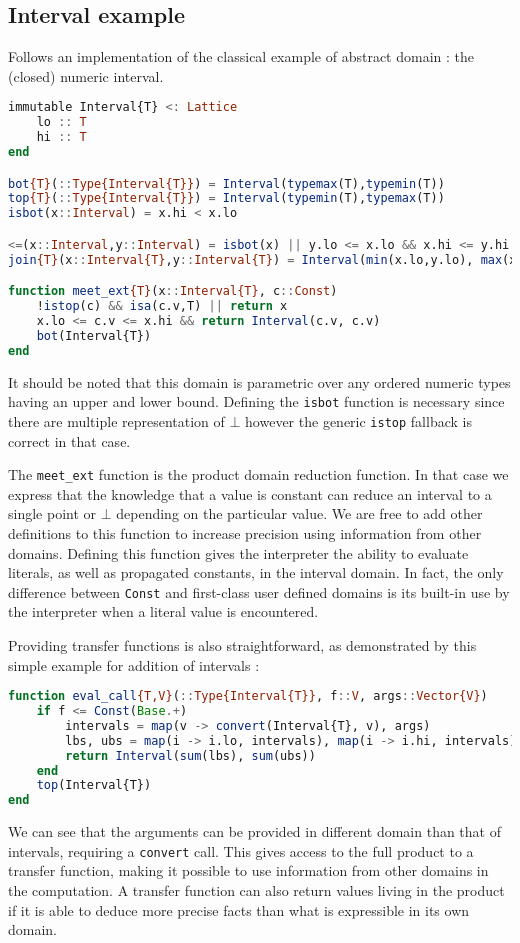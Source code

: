 \documentclass[11pt]{article}
\begin{document}
\subsection*{Interval example}
Follows an implementation of the classical example of abstract domain : the (closed) numeric interval.
\begin{singlespace}
\begin{lstlisting}[language=julia]
immutable Interval{T} <: Lattice
    lo :: T
    hi :: T
end

bot{T}(::Type{Interval{T}}) = Interval(typemax(T),typemin(T))
top{T}(::Type{Interval{T}}) = Interval(typemin(T),typemax(T))
isbot(x::Interval) = x.hi < x.lo

<=(x::Interval,y::Interval) = isbot(x) || y.lo <= x.lo && x.hi <= y.hi
join{T}(x::Interval{T},y::Interval{T}) = Interval(min(x.lo,y.lo), max(x.hi,y.hi))

function meet_ext{T}(x::Interval{T}, c::Const)
    !istop(c) && isa(c.v,T) || return x
    x.lo <= c.v <= x.hi && return Interval(c.v, c.v)
    bot(Interval{T})
end
\end{lstlisting}
\end{singlespace}
It should be noted that this domain is parametric over any ordered numeric types having an upper and lower bound. Defining the \verb~isbot~ function is necessary since there are multiple representation of $\bot$ however the generic \verb~istop~ fallback is correct in that case.

The \verb~meet_ext~ function is the product domain reduction function. In that case we express that the knowledge that a value is constant can reduce an interval to a single point or $\bot$ depending on the particular value. We are free to add other definitions to this function to increase precision using information from other domains.
Defining this function gives the interpreter the ability to evaluate literals, as well as propagated constants, in the interval domain. In fact, the only difference between \verb~Const~ and first-class user defined domains is its built-in use by the interpreter when a literal value is encountered.

Providing transfer functions is also straightforward, as demonstrated by this simple example for addition of intervals :
\begin{singlespace}
\begin{lstlisting}[language=julia]
function eval_call{T,V}(::Type{Interval{T}}, f::V, args::Vector{V})
    if f <= Const(Base.+)
        intervals = map(v -> convert(Interval{T}, v), args)
        lbs, ubs = map(i -> i.lo, intervals), map(i -> i.hi, intervals)
        return Interval(sum(lbs), sum(ubs))
    end
    top(Interval{T})
end
\end{lstlisting}
\end{singlespace}
We can see that the arguments can be provided in different domain than that of intervals, requiring a \verb~convert~ call. This gives access to the full product to a transfer function, making it possible to use information from other domains in the computation. A transfer function can also return values living in the product if it is able to deduce more precise facts than what is expressible in its own domain.
\end{document}

